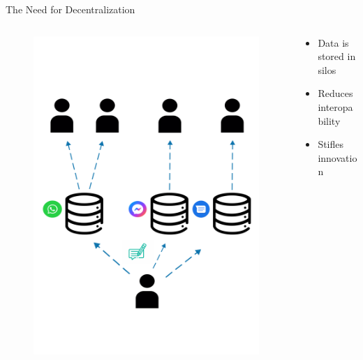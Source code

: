 \begin{frame}{The Need for Decentralization}


    \begin{columns}[T] %
        \begin{column}{.48\textwidth}

       \begin{figure}
            \centering
            \includegraphics[height = .7\textheight]{figures/bad_messages_enzo}
        \end{figure}

        \end{column}%
        \hfill%
        \begin{column}{.48\textwidth}
            \bigskip
            \begin{itemize}
                \item Data is stored in silos
                \item Reduces interopability
                \item Stifles innovation
            \end{itemize}
        \end{column}%
    \end{columns}
\end{frame}


